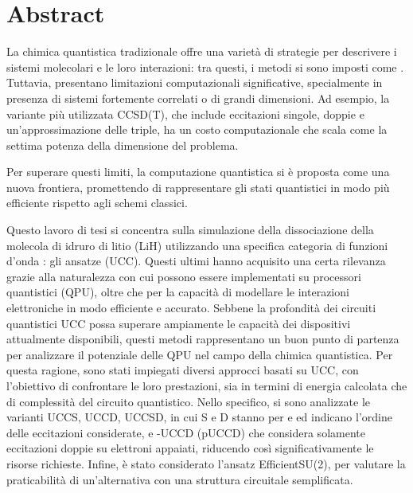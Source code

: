 
\chapter*{Abstract}



La chimica quantistica tradizionale offre una varietà di strategie per descrivere i sistemi molecolari e le loro interazioni: tra questi, i metodi  si sono imposti come . Tuttavia, presentano limitazioni computazionali significative, specialmente in presenza di sistemi fortemente correlati o di grandi dimensioni. Ad esempio, la variante più utilizzata  CCSD(T), che include eccitazioni singole, doppie e un'approssimazione delle triple, ha un costo computazionale che scala come la settima potenza della dimensione del problema.

Per superare questi limiti, la computazione quantistica si è proposta come una nuova frontiera, promettendo di rappresentare gli stati quantistici in modo più efficiente rispetto agli schemi classici.

Questo lavoro di tesi si concentra sulla simulazione della dissociazione della molecola di idruro di litio (LiH) utilizzando una specifica categoria di funzioni d'onda : gli ansatze  (UCC). Questi ultimi hanno acquisito una certa rilevanza grazie alla naturalezza con cui possono essere implementati su processori quantistici (QPU), oltre che per la capacità di modellare le interazioni elettroniche in modo efficiente e accurato. 
Sebbene la profondità dei circuiti quantistici UCC possa superare ampiamente le capacità dei dispositivi attualmente disponibili, questi metodi rappresentano un buon punto di partenza per analizzare il potenziale delle QPU nel campo della chimica quantistica. Per questa ragione, sono stati impiegati diversi approcci basati su UCC, con l’obiettivo di confrontare le loro prestazioni, sia in termini di energia calcolata che di complessità del circuito quantistico. Nello specifico, si sono analizzate le varianti UCCS, UCCD, UCCSD, in cui S e D stanno per  e  ed indicano l'ordine delle eccitazioni considerate, e -UCCD (pUCCD) che considera solamente eccitazioni doppie su elettroni appaiati, riducendo così significativamente le risorse richieste. Infine, è stato considerato l'ansatz  EfficientSU(2), per valutare la praticabilità di un’alternativa con una struttura circuitale semplificata.


